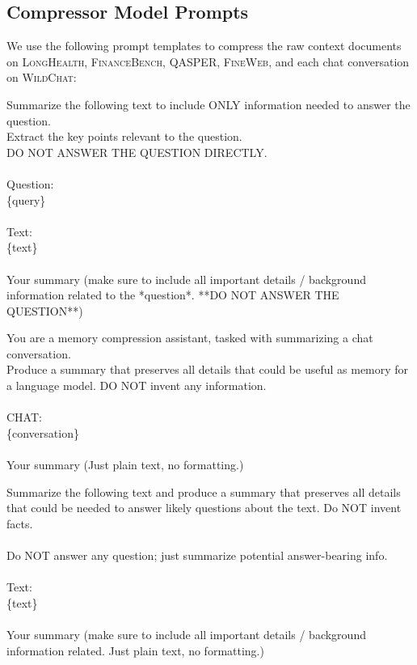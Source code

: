\documentclass{article} %
\begin{document}
\subsection{Compressor Model Prompts}
\label{sec:appendix-prompts-compression}
We use the following prompt templates to compress the raw context documents on \textsc{LongHealth}, \textsc{FinanceBench}, \textsc{QASPER}, \textsc{FineWeb}, and each chat conversation on \textsc{WildChat}:

\begin{examplebox}
    \ttfamily
Summarize the following text to include ONLY information needed to answer the question.\\
Extract the key points relevant to the question.\\
DO NOT ANSWER THE QUESTION DIRECTLY.\\
\\
Question: \\
\{query\} \\
\\
Text: \\
\{text\}\\
\\
Your summary (make sure to include all important details / background information related to the *question*. **DO NOT ANSWER THE QUESTION**)
\end{examplebox}

\begin{examplebox}
    \ttfamily
You are a memory compression assistant, tasked with summarizing a chat conversation. \\
Produce a summary that preserves all details that could be useful as memory for a language model. DO NOT invent any information. \\
\\
CHAT: \\ 
\{conversation\}\\
\\
Your summary (Just plain text, no formatting.)
\end{examplebox}

\begin{examplebox}
    \ttfamily
Summarize the following text and produce a summary that preserves all details that could be needed to answer likely questions about the text. Do NOT invent facts.\\
\\
Do NOT answer any question; just summarize potential answer-bearing info. \\
\\
Text: \\
\{text\}\\
\\
Your summary (make sure to include all important details / background information related. Just plain text, no formatting.)
\end{examplebox}
\end{document}
